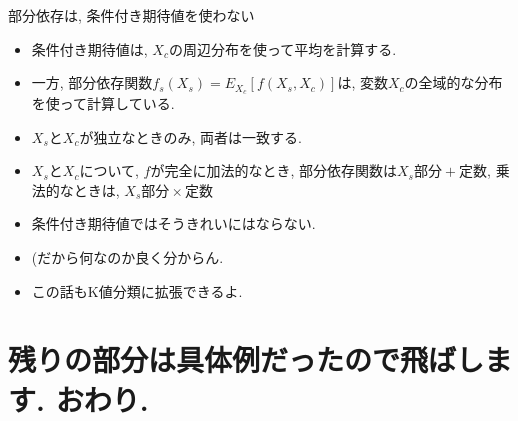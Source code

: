 \documentclass[dvipdfmx,8pt]{beamer}
\begin{document}
  \begin{frame}{部分依存は, 条件付き期待値を使わない}
    \begin{itemize}
      \item 条件付き期待値は, $X_c$の周辺分布を使って平均を計算する.
      \item 一方, 部分依存関数$f_s(X_s)=E_{X_c}[f(X_s,X_c)]$は, 変数$X_c$の全域的な分布を使って計算している.
      \item $X_s$と$X_c$が独立なときのみ, 両者は一致する.
      \item $X_s$と$X_c$について, $f$が完全に加法的なとき, 部分依存関数は$X_s\mbox{部分}+\mbox{定数}$, 乗法的なときは, $X_s\mbox{部分} \times \mbox{定数}$
      \item 条件付き期待値ではそうきれいにはならない.
      \item (だから何なのか良く分からん.
      \item この話もK値分類に拡張できるよ.
    \end{itemize}
  \end{frame}
  \section{残りの部分は具体例だったので飛ばします. おわり. }
\end{document}
